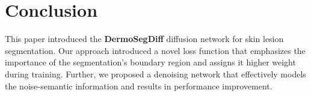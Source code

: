 \documentclass[runningheads]{llncs}
\begin{document}
\section{Conclusion}
This paper introduced the \textbf{DermoSegDiff} diffusion network for skin lesion segmentation. Our approach introduced a novel loss function that emphasizes the importance of the segmentation's boundary region and assigns it higher weight during training. Further, we proposed a denoising network that effectively models the noise-semantic information and results in performance improvement.



\end{document}
